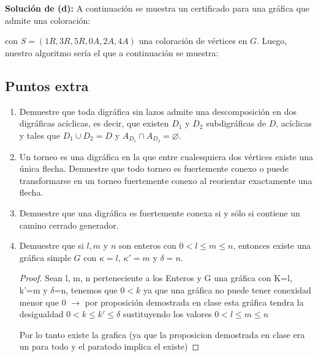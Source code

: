 \documentclass{article}
\begin{document}
\textbf{Soluci\'on de (d):}
A continuaci\'on se muestra un certificado para una gr\'afica que admite una coloraci\'on:
\begin{figure}[ht!]
  \centering
\end{figure}

con $S = (1R,3R,5R,0A,2A,4A)$ una coloraci\'on de v\'ertices en $G$. Luego,
nuestro algoritmo ser\'ia el que a continuaci\'on se muestra:


\subsection*{Puntos extra}
  \begin{enumerate}
    \item Demuestre que toda digr\'afica sin lazos admite una
      descomposici\'on en dos digr\'aficas ac\'iclicas, es decir, que
      existen $D_1$ y $D_2$ subdigr\'aficas de $D$, ac\'iclicas y
      tales que $D_1 \cup D_2 = D$ y $A_{D_1} \cap A_{D_2} =
      \varnothing$.

    \item Un torneo es una digr\'afica en la que entre cualesquiera
      dos v\'ertices existe una \'unica flecha.   Demuestre que todo
      torneo es fuertemente conexo o puede transformarse en un
      torneo fuertemente conexo al reorientar exactamente una
      flecha.

    \item Demuestre que una digr\'afica es fuertemente conexa si
      y s\'olo si contiene un camino cerrado generador.

    \item Demuestre que si $l, m$ y $n$ son enteros con $0 < l \le
      m \le n$, entonces existe una gr\'afica simple $G$ con $\kappa
      = l$, $\kappa' = m$ y $\delta = n$.

      \begin{proof}
        Sean l, m, n perteneciente a los Enteros  y G una gráfica con K=l, k'=m y $\delta$=n, tenemos que $0<k$ ya que una gráfica no puede tener conexidad menor que 0  $\rightarrow$ por proposición demostrada en clase esta gráfica tendra la desigualdad $0<k \leqslant k' \leqslant \delta $ sustituyendo los valores  $0 < l \leqslant m \leqslant n$

        Por lo tanto existe la grafica (ya que la proposicion demostrada en clase era un para todo y el paratodo implica el existe)
      \end{proof}
  \end{enumerate}
\end{document}
